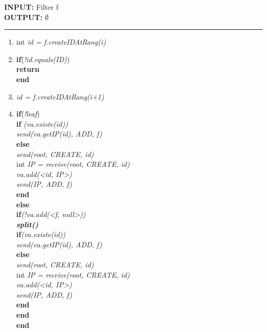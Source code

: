 \documentclass[a4paper,11pt]{report}
\begin{document}
\begin{flushleft}
	\begin{framed}
		\textbf{INPUT:} Filter f\\
		\textbf{OUTPUT:} $\emptyset$
		\noindent\rule{\linewidth}{0.5pt}

		\begin{enumerate}
			\item int \textit{id = f.createIDAtRang(i)}
			\item
			\begin{tabbing}
				\textbf{if}\= (\textit{!id.equals(ID)})\\
					\> \textbf{return}\\
				\textbf{end}
			\end{tabbing}
			\item \textit{id = f.createIDAtRang(i+1)}
			\item
			\begin{tabbing}
				\textbf{if}\= (\textit{!leaf})\\
					\> \textbf{if} \= \textit{(va.existe(id))} \\
					\> \> \textit{send(va.getIP(id), ADD, f)}\\
					\> \textbf{else}\\
					\> \> \textit{send(root, CREATE, id)} \\
					\> \> int \textit{IP = receive(root, CREATE, id)}\\
					\> \> \textit{va.add(<id, IP>)}\\
					\> \> \textit{send(IP, ADD, f)}\\
					\> \textbf{end}\\
				\textbf{else}\\
					\> \textbf{if}\= \textit{(!va.add(<f, null>))}\\
					\> \> \textit{\textbf{split()}}\\
					\> \> \textbf{if}\= \textit{(va.existe(id))} \\
					\> \> \> \textit{send(va.getIP(id), ADD, f)}\\
					\> \> \textbf{else}\\
					\> \> \> \textit{send(root, CREATE, id)} \\
					\> \> \> int \textit{IP = receive(root, CREATE, id)}\\
					\> \> \> \textit{va.add(<id, IP>)}\\
					\> \> \> \textit{send(IP, ADD, f)}\\
					\> \> \textbf{end}\\
					\> \textbf{end}\\
				\textbf{end}
			\end{tabbing}
		\end{enumerate}
	\end{framed}
\end{flushleft}
\end{document}
